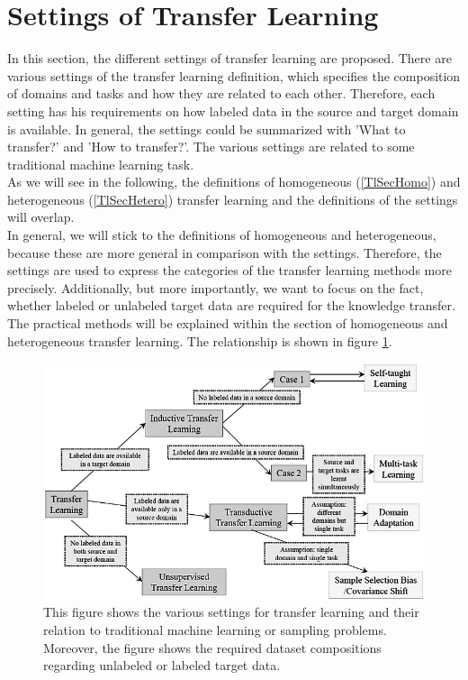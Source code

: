 \section{Settings of Transfer Learning}\label{DefTlSecSett} %
In this section, the different settings of transfer learning are proposed.
There are various settings of the transfer learning definition, which specifies the composition of domains and tasks and how they are related to each other.
Therefore, each setting has his requirements on how labeled data in the source and target domain is available.
In general, the settings could be summarized with 'What to transfer?' and 'How to transfer?'.
The various settings are related to some traditional machine learning task.\cite{Pan.2010}\\
As we will see in the following, the definitions of homogeneous (\ref{TlSecHomo}) and heterogeneous (\ref{TlSecHetero}) transfer learning and the definitions of the settings will overlap.\cite[p. 5-6]{Weiss.2016}\\
In general, we will stick to the definitions of homogeneous and heterogeneous, because these are more general in comparison with the settings.
Therefore, the settings are used to express the categories of the transfer learning methods more precisely.
Additionally, but more importantly, we want to focus on the fact, whether labeled or unlabeled target data are required for the knowledge transfer.
The practical methods will be explained within the section of homogeneous and heterogeneous transfer learning.
The relationship is shown in figure \ref{FigSettingsTransferLearning}.
\begin{figure}
	\centering
	\includegraphics[width=.8\linewidth]{figures/SettingsTransferLearning.png}
	\caption[Settings of Transfer Learning]{This figure shows the various settings for transfer learning and their relation to traditional machine learning or sampling problems. Moreover, the figure shows the required dataset compositions regarding unlabeled or labeled target data.\cite{Pan.2010}}
	\label{FigSettingsTransferLearning}
\end{figure}

